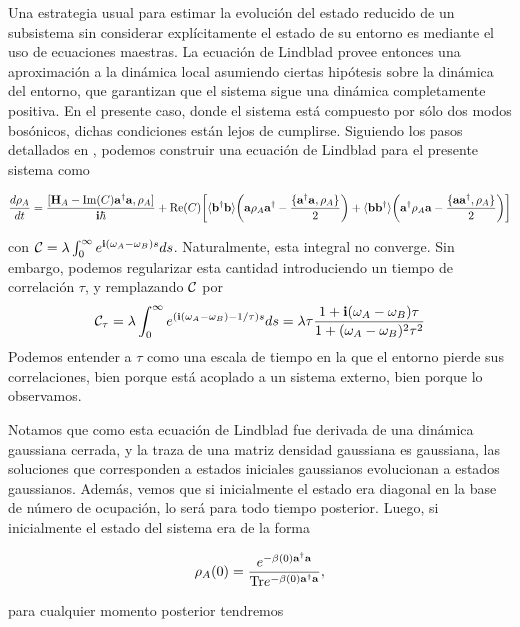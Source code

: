 \documentclass{report} %
\numberwithin{equation}{section}
\begin{document}
Una estrategia usual para estimar la evolución del estado reducido de un subsistema sin considerar explícitamente el estado de su entorno es mediante el uso de ecuaciones maestras. La ecuación de Lindblad provee entonces una aproximación a la dinámica local asumiendo ciertas hipótesis sobre la dinámica del entorno, que garantizan que el sistema sigue una dinámica completamente positiva. En el presente caso, donde el sistema está compuesto por sólo dos modos bosónicos, dichas condiciones están lejos de cumplirse.
Siguiendo los pasos detallados en \cite{HeinzPetruccione}, podemos construir una ecuación de Lindblad para el presente sistema como

 \begin{equation}
\frac{d\rho_A}{dt}=\frac{[{\bf H}_A-\Im(C) {\mathbf a}^\dagger {\mathbf a},\rho_A]}{{\bf i}\hbar } +  \Re(C)  \bigg[
  \langle {\mathbf b}^\dagger{\mathbf b}\rangle
\bigg({\mathbf a} \rho_A{\mathbf a}^\dagger - \frac{\{{\mathbf a}^\dagger{\mathbf a},\rho_A\}}{2}\bigg)
+\langle {\mathbf b}{\mathbf b}^\dagger\rangle
\bigg({\mathbf a}^\dagger \rho_A{\mathbf a} - \frac{\{{\mathbf a}{\mathbf a}^\dagger,\rho_A\}}{2}\bigg)
\bigg]\label{eq:lindbladbosA}
\end{equation}

con $\mathcal{C}=\lambda \int_{0}^{\infty} e^{{\bf i} (\omega_A-\omega_B)s}ds$. Naturalmente, esta integral no converge. Sin embargo, podemos regularizar esta cantidad introduciendo un tiempo de correlación $\tau$, y remplazando ${\cal C}$ por
$${\cal C}_\tau=\lambda\int_{0}^{\infty} e^{({\bf i} (\omega_A-\omega_B)-1/\tau) s}ds=\lambda\tau\frac{1+{\bf i}(\omega_A-\omega_B)\tau}{1+(\omega_A-\omega_B)^2\tau^2}$$
Podemos entender a $\tau$ como una escala de tiempo en la que el entorno pierde sus correlaciones, bien porque está acoplado a un sistema externo, bien porque lo observamos.

Notamos que como esta ecuación de Lindblad fue derivada de una dinámica gaussiana cerrada, y la traza de una matriz densidad gaussiana es gaussiana, las soluciones que corresponden a estados iniciales gaussianos evolucionan a estados gaussianos. Además, vemos que si inicialmente el estado era diagonal en la base de número de ocupación, lo será para todo tiempo posterior. Luego, si inicialmente el estado del sistema era de la forma

$$
\rho_A(0)=\frac{e^{-\beta(0){\mathbf a}^\dagger {\mathbf a}}}{{\Tr}e^{-\beta(0){\mathbf a}^\dagger {\mathbf a}}},
$$

para cualquier momento posterior tendremos
\end{document}
